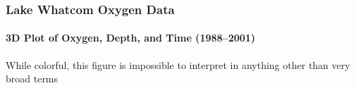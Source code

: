 \documentclass[10pt]{beamer}
\newcommand{\iwsframe}[2]{
\begin{frame}[fragile]
\frametitle{#1}
\framesubtitle{#2}
}
\begin{document}
\iwsframe{Lake Whatcom Oxygen Data}{3D Plot of Oxygen, Depth, and Time (1988--2001)}
\begin{center}
\end{center}

{\scriptsize While colorful, this figure is impossible to interpret in anything other than very broad terms\\}

\end{frame}
\end{document}
